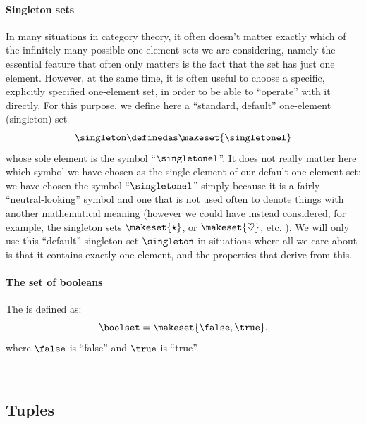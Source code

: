 \paragraph{Singleton sets}
\label{def:singleton}
In many situations in category theory, it often doesn't matter exactly which of the infinitely-many possible one-element sets we are considering, namely the essential feature that often only matters is the fact that the set has just one element.
However, at the same time, it is often useful to choose a specific, explicitly specified one-element set, in order to be able to ``operate'' with it directly.
For this purpose, we define here a ``standard, default'' one-element (singleton) set
\begin{equation}
    \singleton \definedas \makeset{\singletonel}
\end{equation}
whose sole element is the symbol ``$\singletonel$''.
It does not really matter here which symbol we have chosen as the single element of our default one-element set; we have chosen the symbol ``$\singletonel$'' simply because it is a fairly ``neutral-looking'' symbol and one that is not used often to denote things with another mathematical meaning (however we could have instead considered, for example, the singleton sets $\makeset{\star}$, or $\makeset{\heartsuit}$, etc. ).
We will only use this ``default'' singleton set $\singleton$ in situations where all we care about is that it contains exactly one element, and the properties that derive from this.

\paragraph{The set of booleans}
\label{def:booleans}
The  is defined as:
\begin{equation}
    \boolset = \makeset{ \false, \true },
\end{equation}
where $\false$ is ``false'' and $\true$ is ``true''.


\


\subsection{Tuples}
\label{sec:tuples}

